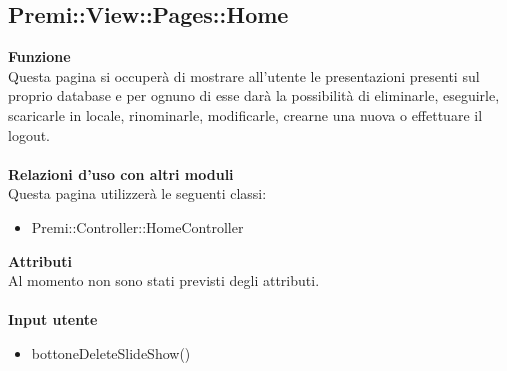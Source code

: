 {				\subsection{Premi::View::Pages::Home}{
						\textbf{Funzione}\\
						\indent Questa pagina si occuperà di mostrare all'utente le presentazioni presenti sul proprio database e per ognuno di esse darà la possibilità di eliminarle, eseguirle, scaricarle in locale, rinominarle, modificarle, crearne una nuova o effettuare il logout.\\\\
						\textbf{Relazioni d'uso con altri moduli}\\
						\indent Questa pagina utilizzerà le seguenti classi:
						\begin{itemize}
							\item Premi::Controller::HomeController
						\end{itemize}
						\textbf{Attributi}\\
						\indent Al momento non sono stati previsti degli attributi.\\\\
						\textbf{Input utente}
						\begin{itemize}
							\item bottoneDeleteSlideShow()
							

\end{itemize}}}
